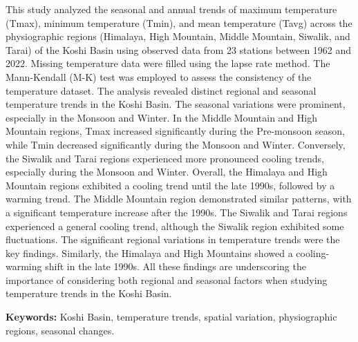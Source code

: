 

This study analyzed the seasonal and annual trends of maximum temperature (Tmax), minimum temperature (Tmin), and mean temperature (Tavg) across the physiographic regions (Himalaya, High Mountain, Middle Mountain, Siwalik, and Tarai) of the Koshi Basin using observed data from 23 stations between 1962 and 2022. Missing temperature data were filled using the lapse rate method. The Mann-Kendall (M-K) test was employed to assess the consistency of the temperature dataset. The analysis revealed distinct regional and seasonal temperature trends in the Koshi Basin. The seasonal variations were prominent, especially in the Monsoon and Winter. In the Middle Mountain and High Mountain regions, Tmax increased significantly during the Pre-monsoon season, while Tmin decreased significantly during the Monsoon and Winter. Conversely, the Siwalik and Tarai regions experienced more pronounced cooling trends, especially during the Monsoon and Winter. Overall, the Himalaya and High Mountain regions exhibited a cooling trend until the late 1990s, followed by a warming trend. The Middle Mountain region demonstrated similar patterns, with a significant temperature increase after the 1990s. The Siwalik and Tarai regions experienced a general cooling trend, although the Siwalik region exhibited some fluctuations. The significant regional variations in temperature trends were the key findings. Similarly, the Himalaya and High Mountains showed a cooling-warming shift in the late 1990s. All these findings are underscoring the importance of considering both regional and seasonal factors when studying temperature trends in the Koshi Basin.


\textbf{Keywords:} Koshi Basin, temperature trends, spatial variation, physiographic regions, seasonal changes.

